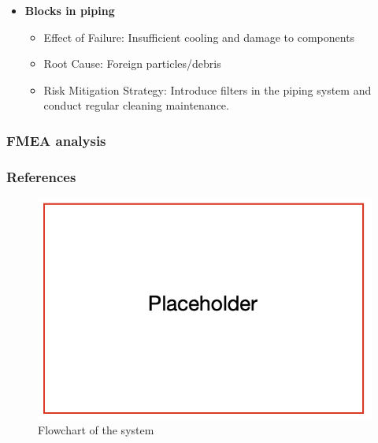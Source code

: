 \begin{itemize}
\begin{itemize}
    \end{itemize}
  \item \textbf{Blocks in piping}
    \begin{itemize}
      \item Effect of Failure: Insufficient cooling and damage to components
      \item Root Cause: Foreign particles/debris
      \item Risk Mitigation Strategy: Introduce filters in the piping system and conduct regular cleaning maintenance.
    \end{itemize}
\end{itemize}


\subsubsection{FMEA analysis}

\subsubsection{References}

\begin{figure}[ht]
  \centering
  \includegraphics[width=\linewidth]{texfiles/mech/eimg/cooling/placeholder}
  \caption{Flowchart of the system}
  \label{fig:schematic}
\end{figure}




